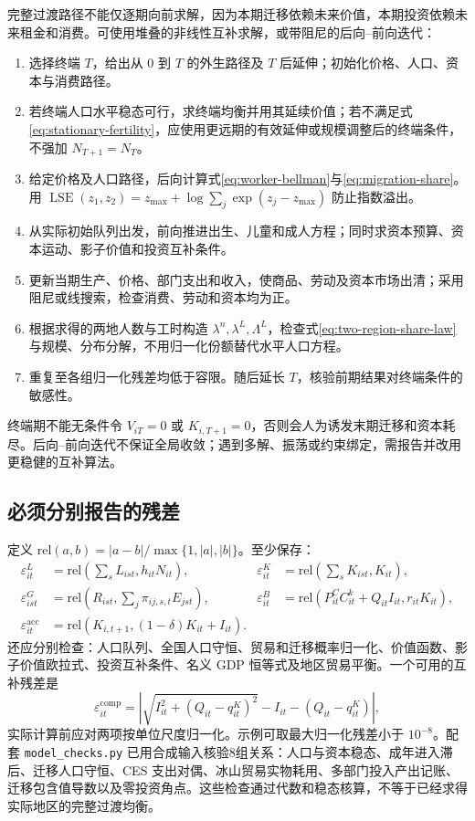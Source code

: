 \documentclass[UTF8,a4paper,zihao=-4,fontset=windows]{ctexart}
\numberwithin{equation}{section}
\newcommand{\pc}{P^{C}}
\newcommand{\invp}{Q}
\DeclareMathOperator{\LSE}{LSE}
\begin{document}
完整过渡路径不能仅逐期向前求解，因为本期迁移依赖未来价值，本期投资依赖未来租金和消费。可使用堆叠的非线性互补求解，或带阻尼的后向--前向迭代：
\begin{enumerate}
 \item 选择终端 $T$，给出从 $0$ 到 $T$ 的外生路径及 $T$ 后延伸；初始化价格、人口、资本与消费路径。
 \item 若终端人口水平稳态可行，求终端均衡并用其延续价值；若不满足式\eqref{eq:stationary-fertility}，应使用更远期的有效延伸或规模调整后的终端条件，不强加 $N_{T+1}=N_T$。
 \item 给定价格及人口路径，后向计算式\eqref{eq:worker-bellman}与\eqref{eq:migration-share}。用 $\LSE(z_1,z_2)=z_{\max}+\log\sum_j\exp(z_j-z_{\max})$ 防止指数溢出。
 \item 从实际初始队列出发，前向推进出生、儿童和成人方程；同时求资本预算、资本运动、影子价值和投资互补条件。
 \item 更新当期生产、价格、部门支出和收入，使商品、劳动及资本市场出清；采用阻尼或线搜索，检查消费、劳动和资本均为正。
 \item 根据求得的两地人数与工时构造 $\lambda^n,\lambda^L,\Lambda^L$，检查式\eqref{eq:two-region-share-law}与规模、分布分解，不用归一化份额替代水平人口方程。
 \item 重复至各组归一化残差均低于容限。随后延长 $T$，核验前期结果对终端条件的敏感性。
\end{enumerate}
终端期不能无条件令 $V_{iT}=0$ 或 $K_{i,T+1}=0$，否则会人为诱发末期迁移和资本耗尽。后向--前向迭代不保证全局收敛；遇到多解、振荡或约束绑定，需报告并改用更稳健的互补算法。

\subsection{必须分别报告的残差}
定义 $\mathrm{rel}(a,b)=|a-b|/\max\{1,|a|,|b|\}$。至少保存：
\begin{align}
 \varepsilon^L_{it}&=\mathrm{rel}\left(\sum_sL_{ist},h_{it}N_{it}\right),&
 \varepsilon^K_{it}&=\mathrm{rel}\left(\sum_sK_{ist},K_{it}\right),\\
 \varepsilon^G_{ist}&=\mathrm{rel}\left(R_{ist},\sum_j\pi_{ij,s,t}E_{jst}\right),&
 \varepsilon^B_{it}&=\mathrm{rel}\left(\pc_{it}C^k_{it}+\invp_{it}I_{it},r_{it}K_{it}\right),\\
 \varepsilon^{\mathrm{acc}}_{it}&=\mathrm{rel}\left(K_{i,t+1},(1-\delta)K_{it}+I_{it}\right).
\end{align}
还应分别检查：人口队列、全国人口守恒、贸易和迁移概率归一化、价值函数、影子价值欧拉式、投资互补条件、名义 GDP 恒等式及地区贸易平衡。一个可用的互补残差是
\begin{equation}
 \varepsilon^{\mathrm{comp}}_{it}
 =\left|\sqrt{I_{it}^2+(\invp_{it}-q^K_{it})^2}
 -I_{it}-(\invp_{it}-q^K_{it})\right|,
\end{equation}
实际计算前应对两项按单位尺度归一化。示例可取最大归一化残差小于 $10^{-8}$。配套 \texttt{model\_checks.py} 已用合成输入核验8组关系：人口与资本稳态、成年进入滞后、迁移人口守恒、CES 支出对偶、冰山贸易实物耗用、多部门投入产出记账、迁移包含值导数以及零投资角点。这些检查通过代数和稳态核算，不等于已经求得实际地区的完整过渡均衡。
\end{document}
